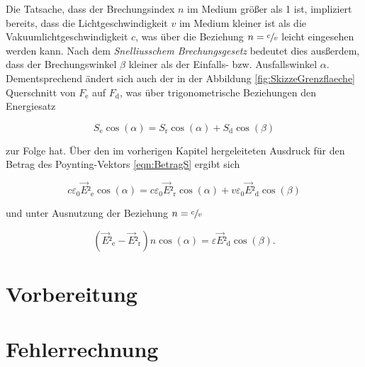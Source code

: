 \noindent Die Tatsache, dass der Brechungsindex $n$ im Medium größer als 1 ist, impliziert bereits, dass die Lichtgeschwindigkeit $v$ im Medium kleiner ist als die
Vakuumlichtgeschwindigkeit $c$, was über die Beziehung $n = \sfrac{c}{v}$ leicht eingesehen werden kann. Nach dem \emph{Snelliusschem Brechungsgesetz} bedeutet dies 
ausßerdem, dass der Brechungswinkel $\beta$ kleiner als der Einfalls- bzw. Ausfallswinkel $\alpha$. Dementsprechend ändert sich auch der in der Abbildung 
\ref{fig:SkizzeGrenzflaeche} Querschnitt von $F_\text{e}$ auf $F_\text{d}$, was über trigonometrische Beziehungen den Energiesatz

\begin{equation*}
    S_\text{e}\cos(\alpha) = S_\text{r}\cos(\alpha) + S_\text{d}\cos(\beta) 
\end{equation*}

\noindent zur Folge hat. Über den im vorherigen Kapitel hergeleiteten Ausdruck für den Betrag des Poynting-Vektors \eqref{eqn:BetragS} ergibt sich 

\begin{equation*}
    c\varepsilon_0\vec{E}²_\text{e}\cos(\alpha) = c\varepsilon_0\vec{E}²_\text{r}\cos(\alpha) + v\varepsilon_0\vec{E}²_\text{d}\cos(\beta)
\end{equation*}

\noindent und unter Ausnutzung der Beziehung $n = \sfrac{c}{v}$

\begin{equation}
    \left(\vec{E}²_\text{e} - \vec{E}²_\text{r}\right)n\cos(\alpha) = \varepsilon\vec{E}²_\text{d}\cos(\beta).
\end{equation}


\section{Vorbereitung}

\section{Fehlerrechnung}
